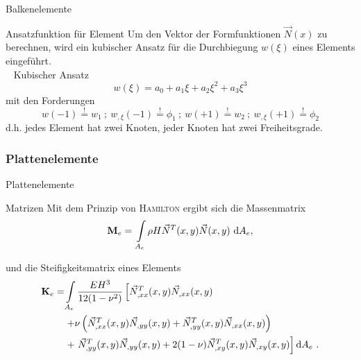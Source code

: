 \begin{frame}{Balkenelemente}
	\begin{block}{Ansatzfunktion für Element}
		Um den Vektor der Formfunktionen $\vec{N}(x)$ zu berechnen, wird ein kubischer Ansatz für die Durchbiegung $ w(\xi) $ eines Elements eingeführt.\\
		\ \newline
		Kubischer Ansatz
		\begin{equation*}
		w(\xi) = a_{0} + a_{1}\xi + a_{2}\xi^{2} + a_{3}\xi^{3}
		\end{equation*}
		mit den	Forderungen
		\begin{equation*}
		w(-1)\overset{!}{=}w_{1} \ ; \ w_{,\xi}(-1)\overset{!}{=}\phi_{1} \ ; \ w(+1)\overset{!}{=}w_{2} \ ; \ w_{,\xi}(+1)\overset{!}{=}\phi_{2}
		\end{equation*}
		d.h. jedes Element hat zwei Knoten, jeder Knoten hat zwei Freiheitsgrade. \\
	\end{block}
\end{frame}

\subsubsection*{Plattenelemente}
\begin{frame}{Plattenelemente}
	\begin{exampleblock}{Matrizen}
		Mit dem Prinzip von \textsc{Hamilton} ergibt sich die Massenmatrix
		\begin{equation*}
		\setlength\abovedisplayskip{2pt}
		\setlength\belowdisplayskip{2pt}
		\mathbf{M}_{e} = \underset{A_{e} \ }{\int} \rho H \vec{N}^{T}(x,y) \vec{N}(x,y) \ \mathrm{d}A_{e} ,
		\end{equation*}
		
		und die Steifigkeitsmatrix eines Elements
		\begin{equation*}
		\setlength\abovedisplayskip{1.5pt}
		\setlength\belowdisplayskip{1.5pt}
		\begin{split}
		\mathbf{K}_{e} = & \underset{A_{e} \ }{\int} \frac{EH^{3}}{12(1-\nu^{2})} \left[ \vec{N}_{,xx}^{T}(x,y)\vec{N}_{,xx}(x,y) \right.  \\
		& \left.  + \nu\left( \vec{N}_{,xx}^{T}(x,y)\vec{N}_{,yy}(x,y)+\vec{N}_{,yy}^{T}(x,y)\vec{N}_{,xx}(x,y)\right) \right. \\
		& \left.  + \ \vec{N}_{,yy}^{T}(x,y)\vec{N}_{,yy}(x,y) +2(1-\nu)\vec{N}_{,xy}^{T}(x,y)\vec{N}_{,xy}(x,y) \right] \mathrm{d}A_{e} \ .
		\end{split} 
		\end{equation*}
	\end{exampleblock}
\end{frame}

